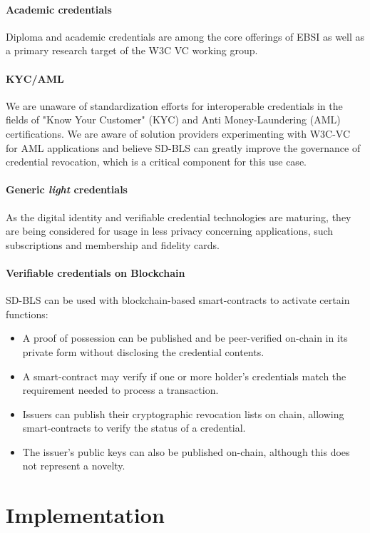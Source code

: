 \paragraph{Academic credentials}
Diploma and academic credentials are among the core offerings of EBSI
as well as a primary research target of the W3C VC working group.

\paragraph{KYC/AML}
We are unaware of standardization efforts for interoperable
credentials in the fields of "Know Your Customer" (KYC) and Anti
Money-Laundering (AML) certifications. We are aware of solution
providers experimenting with W3C-VC for AML applications and believe
SD-BLS can greatly improve the governance of credential revocation,
which is a critical component for this use case.

\paragraph{Generic \textit{light} credentials}
As the digital identity and verifiable credential technologies are
maturing, they are being considered for usage in less privacy
concerning applications, such subscriptions and membership and
fidelity cards.

\paragraph{Verifiable credentials on Blockchain}
SD-BLS can be used with blockchain-based smart-contracts to activate
certain functions:
\begin{itemize}
    \item A proof of possession can be published and be peer-verified
      on-chain in its private form without disclosing the credential
      contents.
    \item A smart-contract may verify if one or more holder's
      credentials match the requirement needed to process a
      transaction.
    \item Issuers can publish their cryptographic revocation lists on
      chain, allowing smart-contracts to verify the status of a
      credential.
    \item The issuer's public keys can also be published on-chain,
      although this does not represent a novelty.
\end{itemize}

\section{Implementation}


